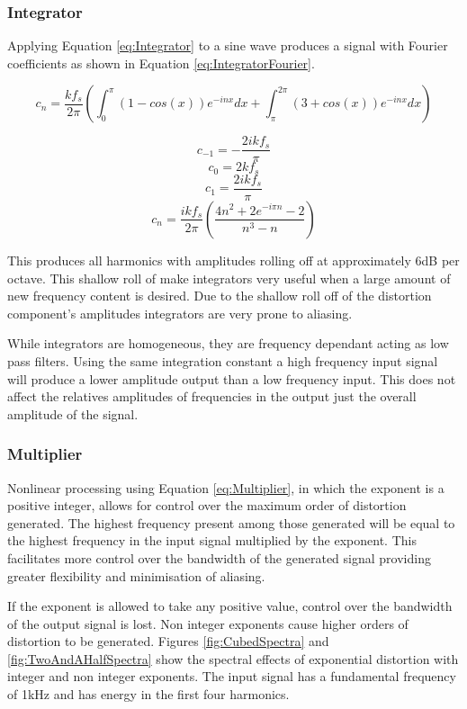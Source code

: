 		\subsubsection*{Integrator}
			Applying Equation \ref{eq:Integrator} to a sine wave produces a signal with Fourier coefficients as
			shown in Equation \ref{eq:IntegratorFourier}.

			\[ c_{n} = \frac{kf_{s}}{2\pi} \left( \int_{0}^{\pi} (1 - cos(x))e^{-inx} dx +
							       \int_{\pi}^{2\pi} (3 + cos(x))e^{-inx} dx \right) \]

			\[ c_{-1} = - \frac{2ikf_{s}}{\pi} \]
			\[ c_{0} = 2kf_{s} \]
			\[ c_{1} = \frac{2ikf_{s}}{\pi} \]
			\begin{equation}
				c_{n} = \frac{ikf_{s}}{2\pi} \left( \frac{4n^{2} + 2e^{-i\pi n} - 2}{n^{3} - n} \right)
				\label{eq:IntegratorFourier}
			\end{equation}

			This produces all harmonics with amplitudes rolling off at approximately 6dB per octave. This
			shallow roll of make integrators very useful when a large amount of new frequency content is
			desired. Due to the shallow roll off of the distortion component's amplitudes integrators are very
			prone to aliasing.

			While integrators are homogeneous, they are frequency dependant acting as low pass filters. Using
			the same integration constant a high frequency input signal will produce a lower amplitude output
			than a low frequency input. This does not affect the relatives amplitudes of frequencies in the
			output just the overall amplitude of the signal.

		\subsubsection*{Multiplier}
			Nonlinear processing using Equation \ref{eq:Multiplier}, in which the exponent is a positive
			integer, allows for control over the maximum order of distortion generated. The highest frequency
			present among those generated will be equal to the highest frequency in the input signal multiplied
			by the exponent. This facilitates more control over the bandwidth of the generated signal providing
			greater flexibility and minimisation of aliasing.

			If the exponent is allowed to take any positive value, control over the bandwidth of the output
			signal is lost. Non integer exponents cause higher orders of distortion to be generated. Figures
			\ref{fig:CubedSpectra} and \ref{fig:TwoAndAHalfSpectra} show the spectral effects of exponential
			distortion with integer and non integer exponents. The input signal has a fundamental frequency of
			1kHz and has energy in the first four harmonics.

